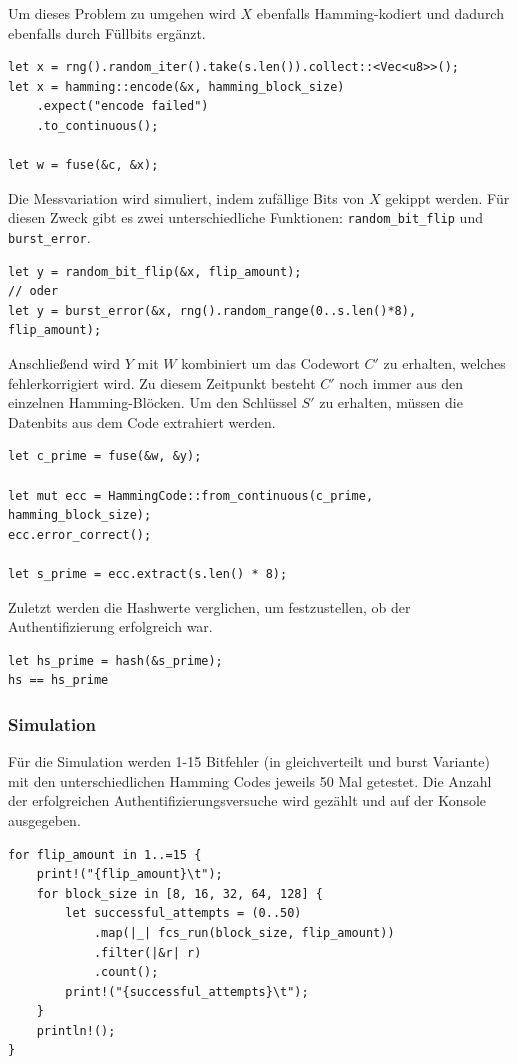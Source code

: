 \documentclass{article}
\begin{document}
    Um dieses Problem zu umgehen wird $X$ ebenfalls Hamming-kodiert und dadurch ebenfalls durch Füllbits ergänzt.
    \begin{verbatim}
let x = rng().random_iter().take(s.len()).collect::<Vec<u8>>();
let x = hamming::encode(&x, hamming_block_size)
    .expect("encode failed")
    .to_continuous();

let w = fuse(&c, &x);
    \end{verbatim}
    Die Messvariation wird simuliert, indem zufällige Bits von $X$ gekippt werden. Für diesen Zweck gibt es zwei unterschiedliche
    Funktionen: \verb|random_bit_flip| und \verb|burst_error|.
    \begin{verbatim}
let y = random_bit_flip(&x, flip_amount);
// oder
let y = burst_error(&x, rng().random_range(0..s.len()*8), flip_amount);
    \end{verbatim}
    Anschließend wird $Y$ mit $W$ kombiniert um das Codewort $C'$ zu erhalten, welches fehlerkorrigiert wird. Zu diesem Zeitpunkt
    besteht $C'$ noch immer aus den einzelnen Hamming-Blöcken. Um den Schlüssel $S'$ zu erhalten, müssen die Datenbits aus dem
    Code extrahiert werden.
    \begin{verbatim}
let c_prime = fuse(&w, &y);

let mut ecc = HammingCode::from_continuous(c_prime, hamming_block_size);
ecc.error_correct();

let s_prime = ecc.extract(s.len() * 8);
    \end{verbatim}
    Zuletzt werden die Hashwerte verglichen, um festzustellen, ob der Authentifizierung erfolgreich war.
    \begin{verbatim}
let hs_prime = hash(&s_prime);
hs == hs_prime
    \end{verbatim}
    \subsubsection{Simulation}
    Für die Simulation werden 1-15 Bitfehler (in gleichverteilt und burst Variante) mit den unterschiedlichen
    Hamming Codes jeweils 50 Mal getestet. Die Anzahl der erfolgreichen Authentifizierungsversuche wird gezählt und auf
    der Konsole ausgegeben.
    \begin{verbatim}
for flip_amount in 1..=15 {
    print!("{flip_amount}\t");
    for block_size in [8, 16, 32, 64, 128] {
        let successful_attempts = (0..50)
            .map(|_| fcs_run(block_size, flip_amount))
            .filter(|&r| r)
            .count();
        print!("{successful_attempts}\t");
    }
    println!();
}
    \end{verbatim}
\end{document}
